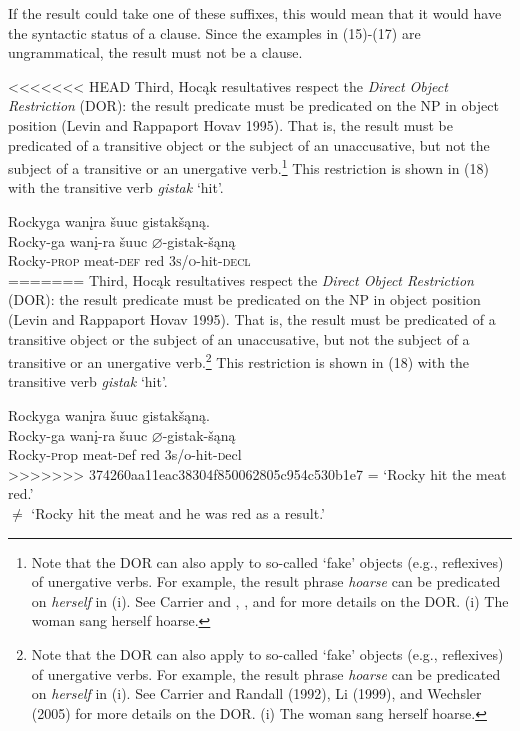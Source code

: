 \documentclass[output=paper]{LSP/langsci}
\begin{document}
\begin{exe}
\begin{exe}
\begin{exe}
\begin{xlist}
{\end{xlist}
\end{exe}

If the result could take one of these suffixes, this would mean that it would have the syntactic status of a clause. Since the examples in (15)-(17) are ungrammatical, the result must not be a clause.

<<<<<<< HEAD
Third, Hocąk resultatives respect the \textit{Direct Object Restriction} (DOR): the result predicate must be predicated on the NP in object position (Levin and Rappaport Hovav 1995). That is, the result must be predicated of a transitive object or the subject of an unaccusative, but not the subject of a transitive or an unergative verb.\footnote{Note that the DOR can also apply to so-called `fake' objects (e.g., reflexives) of unergative verbs. For example, the result phrase \textit{hoarse} can be predicated on \textit{herself} in (i). See Carrier and \citet{Randall1992}, \citet{Li1999}, and \citet{Wechsler2005} for more details on the DOR. (i) The woman sang herself hoarse.} This restriction is shown in (18) with the transitive verb \textit{gistak} `hit'.

\begin{exe}

\ex \glll Rockyga wanįra šuuc gistakšąną.\\ 
Rocky-ga wanį-ra šuuc {$\varnothing$}-gistak-šąną\\
Rocky-\textsc{prop} meat-\textsc{def} red \textsc{3s/o}-hit-\textsc{decl}\\
=======
Third, Hoc\k{a}k resultatives respect the \textit{Direct Object Restriction} (DOR): the result predicate must be predicated on the NP in object position (Levin and Rappaport Hovav 1995). That is, the result must be predicated of a transitive object or the subject of an unaccusative, but not the subject of a transitive or an unergative verb.\footnote{Note that the DOR can also apply to so-called `fake' objects (e.g., reflexives) of unergative verbs. For example, the result phrase \textit{hoarse} can be predicated on \textit{herself} in (i). See Carrier and Randall (1992), Li (1999), and Wechsler (2005) for more details on the DOR. (i) The woman sang herself hoarse.} This restriction is shown in (18) with the transitive verb \textit{gistak} `hit'.

\begin{exe}

\ex \glll Rockyga wan\k{i}ra \v{s}uuc gistak\v{s}\k{a}n\k{a}.\\ 
Rocky-ga wan\k{i}-ra \v{s}uuc $\varnothing$-gistak-\v{s}\k{a}n\k{a}\\
Rocky-{\textsc prop} meat-{\textsc def} red {\textsc 3s/o}-hit-{\textsc decl}\\
>>>>>>> 374260aa11eac38304f850062805c954c530b1e7
\glt = `Rocky hit the meat red.' \vspace{-3pt} \\ 
$\not=$ `Rocky hit the meat  and he was red as a result.'


\end{exe}
\end{exe}
\end{exe}
\end{exe}
\end{document}
